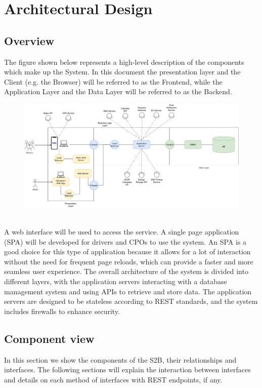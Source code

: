 \section{Architectural Design}
\subsection{Overview}
The figure shown below represents a high-level description of the components which make up the System.
In this document the presentation layer and the Client (e.g. the Browser)
will be referred to as the Frontend, while the Application Layer and the Data Layer
will be referred to as the Backend.

\begin{figure}[H]
    \centering
    \includegraphics[scale=0.42]{src/Overview/overview_diagram.pdf}
\end{figure}

\hfill \\
A web interface will be used to access the service. A single page application (SPA) will be developed for drivers and CPOs to use the system. An SPA is a good choice for this type of application because it allows for a lot of interaction without the need for frequent page reloads, which can provide a faster and more seamless user experience. The overall architecture of the system is divided into different layers, with the application servers interacting with a database management system and using APIs to retrieve and store data. The application servers are designed to be stateless according to REST standards, and the system includes firewalls to enhance security.
\pagebreak
\subsection{Component view}
In this section we show the components of the S2B, their relationships and interfaces. The following sections will explain the interaction between interfaces and details on each method of interfaces with REST endpoints, if any.

